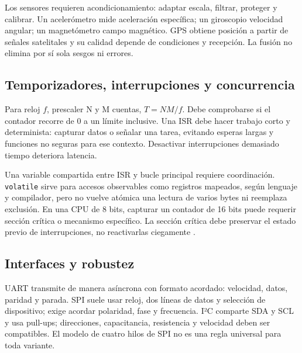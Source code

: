 Los sensores requieren acondicionamiento: adaptar escala, filtrar, proteger y calibrar. Un acelerómetro mide aceleración específica; un giroscopio velocidad angular; un magnetómetro campo magnético. GPS obtiene posición a partir de señales satelitales y su calidad depende de condiciones y recepción. La fusión no elimina por sí sola sesgos ni errores.

\subsection{Temporizadores, interrupciones y concurrencia}
Para reloj $f$, prescaler N y M cuentas, $T=NM/f$. Debe comprobarse si el contador recorre de 0 a un límite inclusive. Una ISR debe hacer trabajo corto y determinista: capturar datos o señalar una tarea, evitando esperas largas y funciones no seguras para ese contexto. Desactivar interrupciones demasiado tiempo deteriora latencia.

Una variable compartida entre ISR y bucle principal requiere coordinación. \texttt{volatile} sirve para accesos observables como registros mapeados, según lenguaje y compilador, pero no vuelve atómica una lectura de varios bytes ni reemplaza exclusión. En una CPU de 8 bits, capturar un contador de 16 bits puede requerir sección crítica o mecanismo específico. La sección crítica debe preservar el estado previo de interrupciones, no reactivarlas ciegamente \cite[secciones Interrupts, I/O Ports, Timers y ADC]{avr}.

\subsection{Interfaces y robustez}
UART transmite de manera asíncrona con formato acordado: velocidad, datos, paridad y parada. SPI suele usar reloj, dos líneas de datos y selección de dispositivo; exige acordar polaridad, fase y frecuencia. I²C comparte SDA y SCL y usa pull-ups; direcciones, capacitancia, resistencia y velocidad deben ser compatibles. El modelo de cuatro hilos de SPI no es una regla universal para toda variante.

